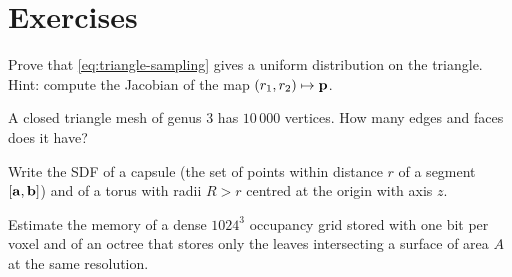 \section*{Exercises}
\begin{exercise}
Prove that \eqref{eq:triangle-sampling} gives a uniform distribution on the triangle. Hint: compute
the Jacobian of the map $(r_1,r_2)\mapsto\mathbf{p}$.
\end{exercise}
\begin{exercise}
A closed triangle mesh of genus 3 has $10\,000$ vertices. How many edges and faces does it have?
\end{exercise}
\begin{exercise}
Write the SDF of a capsule (the set of points within distance $r$ of a segment $[\mathbf{a},\mathbf{b}]$) and of
a torus with radii $R>r$ centred at the origin with axis $z$.
\end{exercise}
\begin{exercise}
Estimate the memory of a dense $1024^3$ occupancy grid stored with one bit per voxel and of an
octree that stores only the leaves intersecting a surface of area $A$ at the same resolution.
\end{exercise}
